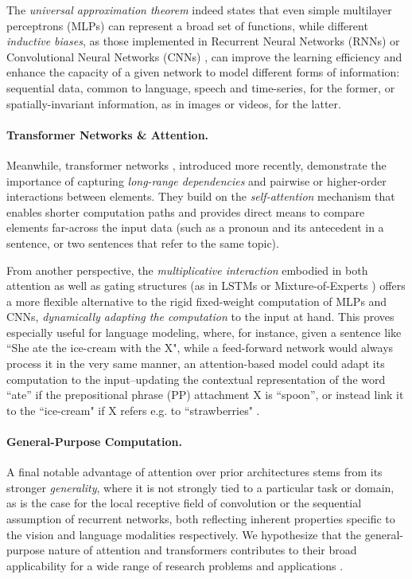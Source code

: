 The \textit{universal approximation theorem} \citep{approx} indeed states that even simple multilayer perceptrons (MLPs) can represent a broad set of functions, while different \textit{inductive biases}, as those implemented in {Recurrent Neural Networks} (RNNs) or {Convolutional Neural Networks} (CNNs) \citep{bengiobook}, can improve the learning efficiency and enhance the capacity of a given network to model different forms of information: sequential data, common to language, speech and time-series, for the former, or spatially-invariant information, as in images or videos, for the latter.

\paragraph{Transformer Networks \& Attention.} Meanwhile, transformer networks \citep{vaswani2017attention}, introduced more recently, demonstrate the importance of capturing \textit{long-range dependencies} and pairwise or higher-order interactions between elements. They build on the \textit{self-attention} mechanism \citep{vaswani2017attention,attention} that enables shorter computation paths and provides direct means to compare elements far-across the input data (such as a pronoun and its antecedent in a sentence, or two sentences that refer to the same topic).

From another perspective, the \textit{multiplicative interaction} embodied in both attention as well as gating structures (as in LSTMs \citep{lstms} or Mixture-of-Experts \citep{moe}) offers a more flexible alternative to the rigid fixed-weight computation of MLPs and CNNs, \textit{dynamically adapting the computation} to the input at hand. This proves especially useful for language modeling, where, for instance, given a sentence like ``She ate the ice-cream with the X", while a feed-forward network would always process it in the very same manner, an attention-based model could adapt its computation to the input--updating the contextual representation of the word ``ate'' if the prepositional phrase (PP) attachment X is ``spoon'', or instead link it to the ``ice-cream" if X refers e.g. to ``strawberries" \citep{ppa}.

\paragraph{General-Purpose Computation.} A final notable advantage of attention over prior architectures stems from its stronger \textit{generality}, where it is not strongly tied to a particular task or domain, as is the case for the local receptive field of convolution or the sequential assumption of recurrent networks, both reflecting inherent properties specific to the vision and language modalities respectively. We hypothesize that the general-purpose nature of attention and transformers contributes to their broad applicability for a wide range of research problems and applications \citep{liu2019roberta,visual_transformer,ganformer}.

